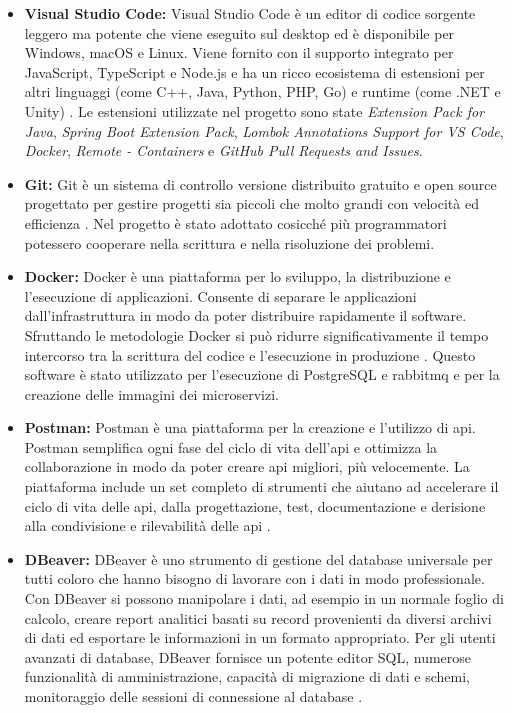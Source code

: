 \begin{itemize}
    \item \textbf{Visual Studio Code:} Visual Studio Code è un editor di codice sorgente leggero ma potente che viene eseguito sul desktop ed è disponibile per Windows, macOS e Linux. Viene fornito con il supporto integrato per JavaScript, TypeScript e Node.js e ha un ricco ecosistema di estensioni per altri linguaggi (come C++, Java, Python, PHP, Go) e runtime (come .NET e Unity) \cite{vscode}. Le estensioni utilizzate nel progetto sono state \textit{Extension Pack for Java}, \textit{Spring Boot Extension Pack}, \textit{Lombok Annotations Support for VS Code}, \textit{Docker}, \textit{Remote - Containers} e \textit{GitHub Pull Requests and Issues}.
    \item \textbf{Git:} Git è un sistema di controllo versione distribuito gratuito e open source progettato per gestire progetti sia piccoli che molto grandi con velocità ed efficienza \cite{git}. Nel progetto è stato adottato cosicché più programmatori potessero cooperare nella scrittura e nella risoluzione dei problemi.
    \item \textbf{Docker:} Docker è una piattaforma per lo sviluppo, la distribuzione e l'esecuzione di applicazioni. Consente di separare le applicazioni dall'infrastruttura in modo da poter distribuire rapidamente il software. Sfruttando le metodologie Docker si può ridurre significativamente il tempo intercorso tra la scrittura del codice e l'esecuzione in produzione \cite{docker}. Questo software è stato utilizzato per l'esecuzione di PostgreSQL e \Gls{rabbitmq} e per la creazione delle immagini dei microservizi.
    \item \textbf{Postman:}\label{postman} Postman è una piattaforma per la creazione e l'utilizzo di \Gls{api}. Postman semplifica ogni fase del ciclo di vita dell'\acrshort{api} e ottimizza la collaborazione in modo da poter creare \acrshort{api} migliori, più velocemente. La piattaforma include un set completo di strumenti che aiutano ad accelerare il ciclo di vita delle \acrshort{api}, dalla progettazione, test, documentazione e derisione alla condivisione e rilevabilità delle \acrshort{api} \cite{postman}.
    \item \textbf{DBeaver:} DBeaver è uno strumento di gestione del database universale per tutti coloro che hanno bisogno di lavorare con i dati in modo professionale. Con DBeaver si possono manipolare i dati, ad esempio in un normale foglio di calcolo, creare report analitici basati su record provenienti da diversi archivi di dati ed esportare le informazioni in un formato appropriato. Per gli utenti avanzati di database, DBeaver fornisce un potente editor SQL, numerose funzionalità di amministrazione, capacità di migrazione di dati e schemi, monitoraggio delle sessioni di connessione al database \cite{dbeaver}.

\end{itemize}

